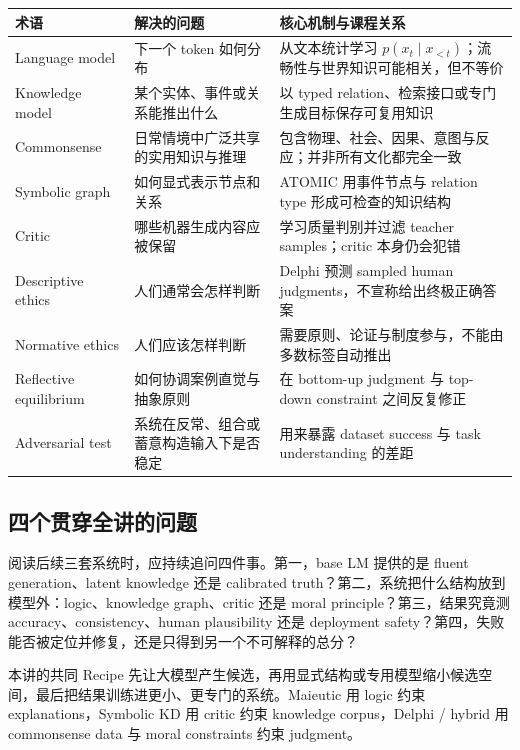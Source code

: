 \documentclass[a4paper]{article}
\begin{document}
\begin{longtable}{@{}L{0.19\textwidth}L{0.27\textwidth}L{0.42\textwidth}@{}}
\toprule
术语 & 解决的问题 & 核心机制与课程关系 \\
\midrule
Language model & 下一个 token 如何分布 & 从文本统计学习 $p(x_t\mid x_{<t})$；流畅性与世界知识可能相关，但不等价 \\
Knowledge model & 某个实体、事件或关系能推出什么 & 以 typed relation、检索接口或专门生成目标保存可复用知识 \\
Commonsense & 日常情境中广泛共享的实用知识与推理 & 包含物理、社会、因果、意图与反应；并非所有文化都完全一致 \\
Symbolic graph & 如何显式表示节点和关系 & ATOMIC 用事件节点与 relation type 形成可检查的知识结构 \\
Critic & 哪些机器生成内容应被保留 & 学习质量判别并过滤 teacher samples；critic 本身仍会犯错 \\
Descriptive ethics & 人们通常会怎样判断 & Delphi 预测 sampled human judgments，不宣称给出终极正确答案 \\
Normative ethics & 人们应该怎样判断 & 需要原则、论证与制度参与，不能由多数标签自动推出 \\
Reflective equilibrium & 如何协调案例直觉与抽象原则 & 在 bottom-up judgment 与 top-down constraint 之间反复修正 \\
Adversarial test & 系统在反常、组合或蓄意构造输入下是否稳定 & 用来暴露 dataset success 与 task understanding 的差距 \\
\bottomrule
\end{longtable}

\subsection{四个贯穿全讲的问题}

阅读后续三套系统时，应持续追问四件事。第一，base LM 提供的是 fluent generation、latent knowledge 还是 calibrated truth？第二，系统把什么结构放到模型外：logic、knowledge graph、critic 还是 moral principle？第三，结果究竟测 accuracy、consistency、human plausibility 还是 deployment safety？第四，失败能否被定位并修复，还是只得到另一个不可解释的总分？

\begin{importantbox}{本讲的共同 Recipe}
先让大模型产生候选，再用显式结构或专用模型缩小候选空间，最后把结果训练进更小、更专门的系统。Maieutic 用 logic 约束 explanations，Symbolic KD 用 critic 约束 knowledge corpus，Delphi / hybrid 用 commonsense data 与 moral constraints 约束 judgment。
\end{importantbox}
\end{document}
